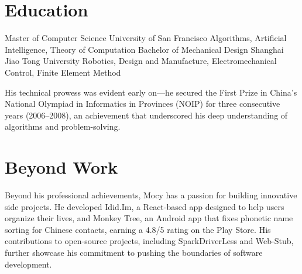 \documentclass[]{friggeri-cv}
\begin{document}

\section{Education}

\begin{entrylist}
  {Master \textnormal{of Computer Science}}
  {University of San Francisco}
  {
    Algorithms, Artificial Intelligence, Theory of Computation
  }
  {Bachelor \textnormal{of Mechanical Design}}
  {Shanghai Jiao Tong University}
  {
    Robotics, Design and Manufacture, Electromechanical Control, Finite Element Method
  }
\end{entrylist}

His technical prowess was evident early on—he secured the First Prize in China’s National Olympiad in Informatics in Provinces (NOIP) for three consecutive years (2006–2008), an achievement that underscored his deep understanding of algorithms and problem-solving.


\section{Beyond Work}

Beyond his professional achievements, Mocy has a passion for building innovative side projects. 
He developed Idid.Im, a React-based app designed to help users organize their lives, 
and Monkey Tree, an Android app that fixes phonetic name sorting for Chinese contacts, 
earning a 4.8/5 rating on the Play Store. 
His contributions to open-source projects, including SparkDriverLess and Web-Stub, 
further showcase his commitment to pushing the boundaries of software development.
\end{document}
